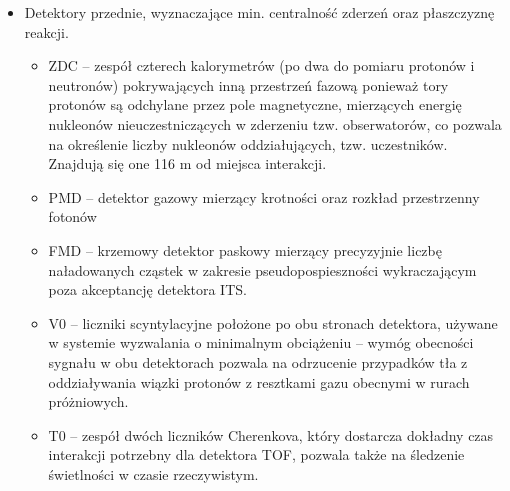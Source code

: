 \begin{itemize}
	\item Detektory przednie, wyznaczające min. centralność zderzeń oraz płaszczyznę reakcji.
	\begin{itemize}
		\item ZDC -- zespół czterech kalorymetrów (po dwa do pomiaru protonów i neutronów) pokrywających inną przestrzeń fazową ponieważ tory protonów są odchylane przez pole magnetyczne, mierzących energię nukleonów nieuczestniczących w zderzeniu tzw. obserwatorów, co pozwala na określenie liczby nukleonów oddziałujących, tzw. uczestników. Znajdują się one 116 m od miejsca interakcji.
		\item PMD -- detektor gazowy mierzący krotności oraz rozkład przestrzenny fotonów
		\item FMD -- krzemowy detektor paskowy mierzący precyzyjnie liczbę naładowanych cząstek w zakresie pseudopospieszności wykraczającym poza akceptancję detektora ITS.
		\item V0 -- liczniki scyntylacyjne położone po obu stronach detektora, używane w systemie wyzwalania o minimalnym obciążeniu  -- wymóg obecności sygnału w obu detektorach pozwala na odrzucenie przypadków tła z oddziaływania wiązki protonów z resztkami gazu obecnymi w rurach próżniowych.
		\item T0 -- zespół dwóch liczników Cherenkova, który dostarcza dokładny czas interakcji potrzebny dla detektora TOF, pozwala także na śledzenie świetlności w czasie rzeczywistym.
	\end{itemize}
\end{itemize}






